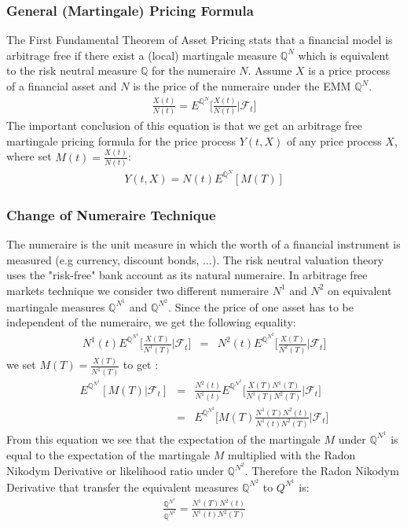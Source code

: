 \documentclass[11pt]{article}
\numberwithin{equation}{subsection}
\begin{document}
\subsubsection{General (Martingale) Pricing Formula}		
The First Fundamental Theorem of Asset Pricing stats that a financial model is arbitrage free if there exist a (local) martingale measure \(\mathbb{Q}^N\) which is equivalent to the risk neutral measure \(\mathbb{Q}\) for the numeraire \(N\). Assume \(X\) is a price process of a financial asset and \(N\) is the price of the numeraire under the EMM \(\mathbb{Q}^N\).
\begin{eqnarray}
	\frac{X(t)}{N(t)} = E^{\mathbb{Q}^N}\bigg[\frac{X(t)}{N(t)}| \mathcal{F}_t\bigg]
\end{eqnarray}
The important conclusion of this equation is that we get an arbitrage free martingale pricing formula for the price process \(Y(t, X)\) of any price process \(X\), where set \(M(t)=\frac{X(t)}{N(t)}\):
\begin{eqnarray}
	Y(t, X) = N(t) E^{\mathbb{Q}^{N}} [M(T)]
\end{eqnarray}
\subsubsection{Change of Numeraire Technique}
The numeraire is the unit measure in which the worth of a financial instrument is measured (e.g currency, discount bonds, ...). The risk neutral valuation theory uses the "risk-free" bank account as its natural numeraire. In arbitrage free markets technique we consider two different numeraire \(N^1\) and \(N^2\) on equivalent martingale measures \(\mathbb{Q}^{N^1}\) and \(\mathbb{Q}^{N^2}\). Since the price of one asset has to be independent of the numeraire, we get the following equality:
\begin{eqnarray*}
	N^{1}(t) E^{\mathbb{Q}^{N^1}} \bigg[\frac{X(T)}{N^1(T)}|\mathcal{F}_t\bigg] &=& N^{2}(t) E^{\mathbb{Q}^{N^2}} \bigg[\frac{X(T)}{N^2(T)}|\mathcal{F}_t\bigg]
\end{eqnarray*}	
we set \(M(T) = \frac{X(T)}{N^1(T)}\) to get :
\begin{eqnarray*}
	 E^{\mathbb{Q}^{N^1}}[M(T)|\mathcal{F}_t]  &=& \frac{N^2(t)}{N^1(t)} E^{\mathbb{Q}^{N^2}} \bigg[\frac{X(T)N^1(T)}{N^1(T)N^2(T)}|\mathcal{F}_t\bigg] \\
	 &=& E^{\mathbb{Q}^{N^2}} \bigg[M(T) \frac{N^1(T)N^2(t)}{N^1(t)N^2(T)}|\mathcal{F}_t\bigg]
\end{eqnarray*}
From this equation we see that the expectation of the martingale \(M\) under \(\mathbb{Q}^{N^1}\) is equal to the expectation of the martingale \(M\) multiplied with the Radon Nikodym Derivative or likelihood ratio under \(\mathbb{Q}^{N^2}\). Therefore the Radon Nikodym Derivative that transfer the equivalent measures \(\mathbb{Q}^{N^2}\) to \(Q^{N^1}\) is:
\begin{eqnarray}
	\frac{\mathbb{Q}^{N^1}}{\mathbb{Q}^{N^2}} = \frac{N^1(T) N^2(t)}{N^1(t) N^2(T)}
\end{eqnarray}
\end{document}
